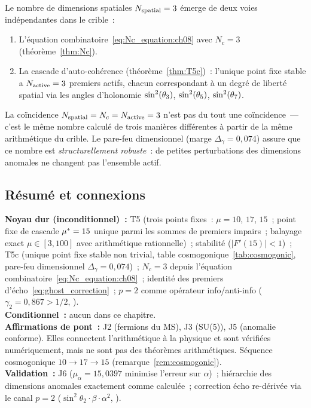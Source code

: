 \documentclass[12pt,a4paper]{article}
\begin{document}
\begin{remarque}
\label{rem:3d_theorem}
Le nombre de dimensions spatiales $N_{\rm spatial} = 3$ émerge de
deux voies indépendantes dans le crible~:
\begin{enumerate}[nosep]
\item L'équation combinatoire~\eqref{eq:Nc_equation:ch08} avec
  $N_c = 3$ (théorème~\ref{thm:Nc}).
\item La cascade d'auto-cohérence (théorème~\ref{thm:T5c})~:
  l'unique point fixe stable a $N_{\rm active} = 3$ premiers actifs,
  chacun correspondant à un degré de liberté spatial via les angles
  d'holonomie $\sin^2(\theta_{3})$, $\sin^2(\theta_{5})$, $\sin^2(\theta_{7})$.
\end{enumerate}
La coïncidence $N_{\rm spatial} = N_c = N_{\rm active} = 3$ n'est
pas du tout une coïncidence~--- c'est le même nombre calculé de trois
manières différentes à partir de la même arithmétique du crible.
Le pare-feu dimensionnel (marge $\Delta_\gamma = 0{,}074$) assure
que ce nombre est \emph{structurellement robuste}~: de petites
perturbations des dimensions anomales ne changent pas l'ensemble
actif.
\end{remarque}

\subsection{Résumé et connexions}
\label{sec:ch8_summary}

\begin{ledgerbox}
\textbf{Noyau dur (inconditionnel)~:} T5 (trois points fixes~:
  $\mu = 10$, $17$, $15$~; point fixe de cascade ${\mu^{*}} = 15$
  unique parmi les sommes de premiers impairs~; balayage exact
  $\mu \in [3,100]$ avec arithmétique rationnelle)~; stabilité
  ($|F'(15)| < 1$)~; T5c (unique point fixe stable non trivial,
  table cosmogonique~\ref{tab:cosmogonic}, pare-feu dimensionnel
  $\Delta_\gamma = 0{,}074$)~; $N_c = 3$ depuis l'équation
  combinatoire~\eqref{eq:Nc_equation:ch08}~; identité des premiers
  d'écho~\eqref{eq:ghost_correction}~; $p = 2$ comme opérateur
  info/anti-info ($\gamma_2 = 0{,}867 > 1/2$,
  \cite{companion_M1}).\\[4pt]
\textbf{Conditionnel~:} aucun dans ce chapitre.\\[4pt]
\textbf{Affirmations de pont~:} J2 (fermions du MS), J3 (SU(5)),
  J5 (anomalie conforme). Elles connectent l'arithmétique à la
  physique et sont vérifiées numériquement, mais ne sont pas des
  théorèmes arithmétiques. Séquence cosmogonique $10 \to 17 \to 15$
  (remarque~\ref{rem:cosmogonic}).\\[4pt]
\textbf{Validation~:} J6 ($\mu_\alpha = 15{,}0397$ minimise
  l'erreur sur $\alpha$)~; hiérarchie des dimensions anomales
  exactement comme calculée~; correction écho re-dérivée via le
  canal $p = 2$ ($\sin^2\theta_2 \cdot \beta \cdot \alpha^2$,
  \cite{companion_physics}).
\end{ledgerbox}
\end{document}
